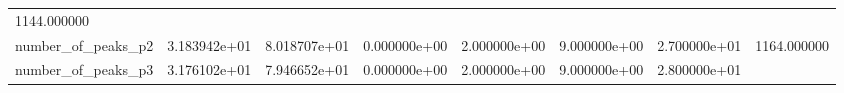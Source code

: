 \documentclass[11pt]{article}
\begin{document}
\begin{longtable}[]{@{}llllllll@{}}
\begin{minipage}[t]{0.08\columnwidth}
1144.000000\strut
\end{minipage}\tabularnewline
\begin{minipage}[t]{0.16\columnwidth}\raggedright
number\_of\_peaks\_p2\strut
\end{minipage} & \begin{minipage}[t]{0.09\columnwidth}\raggedright
3.183942e+01\strut
\end{minipage} & \begin{minipage}[t]{0.09\columnwidth}\raggedright
8.018707e+01\strut
\end{minipage} & \begin{minipage}[t]{0.09\columnwidth}\raggedright
0.000000e+00\strut
\end{minipage} & \begin{minipage}[t]{0.09\columnwidth}\raggedright
2.000000e+00\strut
\end{minipage} & \begin{minipage}[t]{0.09\columnwidth}\raggedright
9.000000e+00\strut
\end{minipage} & \begin{minipage}[t]{0.09\columnwidth}\raggedright
2.700000e+01\strut
\end{minipage} & \begin{minipage}[t]{0.08\columnwidth}\raggedright
1164.000000\strut
\end{minipage}\tabularnewline
\begin{minipage}[t]{0.16\columnwidth}\raggedright
number\_of\_peaks\_p3\strut
\end{minipage} & \begin{minipage}[t]{0.09\columnwidth}\raggedright
3.176102e+01\strut
\end{minipage} & \begin{minipage}[t]{0.09\columnwidth}\raggedright
7.946652e+01\strut
\end{minipage} & \begin{minipage}[t]{0.09\columnwidth}\raggedright
0.000000e+00\strut
\end{minipage} & \begin{minipage}[t]{0.09\columnwidth}\raggedright
2.000000e+00\strut
\end{minipage} & \begin{minipage}[t]{0.09\columnwidth}\raggedright
9.000000e+00\strut
\end{minipage} & \begin{minipage}[t]{0.09\columnwidth}\raggedright
2.800000e+01\strut
\end{minipage} & \begin{minipage}[t]{0.08\columnwidth}\raggedright

\end{minipage}
\end{longtable}
\end{document}
